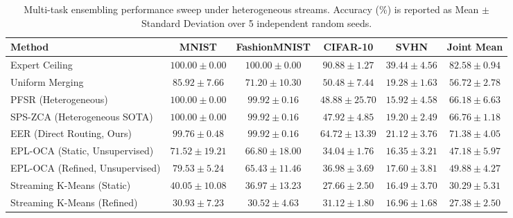 \begin{table}[t]
\caption{Multi-task ensembling performance sweep under heterogeneous streams. Accuracy (\%) is reported as Mean $\pm$ Standard Deviation over 5 independent random seeds.}
\label{tab:main_results}
\vskip 0.15in
\begin{center}
\begin{small}
\begin{sc}
\begin{tabular}{lccccc}
\toprule
Method & MNIST & FashionMNIST & CIFAR-10 & SVHN & Joint Mean \\
\midrule
Expert Ceiling & $100.00 \pm 0.00$ & $100.00 \pm 0.00$ & $90.88 \pm 1.27$ & $39.44 \pm 4.56$ & $\mathbf{82.58 \pm 0.94}$ \\
\midrule
Uniform Merging & $85.92 \pm 7.66$ & $71.20 \pm 10.30$ & $50.48 \pm 7.44$ & $19.28 \pm 1.63$ & $\mathbf{56.72 \pm 2.78}$ \\
PFSR (Heterogeneous) & $100.00 \pm 0.00$ & $99.92 \pm 0.16$ & $48.88 \pm 25.70$ & $15.92 \pm 4.58$ & $\mathbf{66.18 \pm 6.63}$ \\
SPS-ZCA (Heterogeneous SOTA) & $100.00 \pm 0.00$ & $99.92 \pm 0.16$ & $47.92 \pm 4.85$ & $19.20 \pm 2.49$ & $\mathbf{66.76 \pm 1.18}$ \\
\midrule
EER (Direct Routing, Ours) & $99.76 \pm 0.48$ & $99.92 \pm 0.16$ & $64.72 \pm 13.39$ & $21.12 \pm 3.76$ & $\mathbf{71.38 \pm 4.05}$ \\
\midrule
EPL-OCA (Static, Unsupervised) & $71.52 \pm 19.21$ & $66.80 \pm 18.00$ & $34.04 \pm 1.76$ & $16.35 \pm 3.21$ & $\mathbf{47.18 \pm 5.97}$ \\
EPL-OCA (Refined, Unsupervised) & $79.53 \pm 5.24$ & $65.43 \pm 11.46$ & $36.98 \pm 3.69$ & $17.60 \pm 3.81$ & $\mathbf{49.88 \pm 4.27}$ \\
\midrule
Streaming K-Means (Static) & $40.05 \pm 10.08$ & $36.97 \pm 13.23$ & $27.66 \pm 2.50$ & $16.49 \pm 3.70$ & $\mathbf{30.29 \pm 5.31}$ \\
Streaming K-Means (Refined) & $30.93 \pm 7.23$ & $30.52 \pm 4.63$ & $31.12 \pm 1.80$ & $16.96 \pm 1.68$ & $\mathbf{27.38 \pm 2.50}$ \\
\bottomrule
\end{tabular}
\end{sc}
\end{small}
\end{center}
\vskip -0.1in
\end{table}

